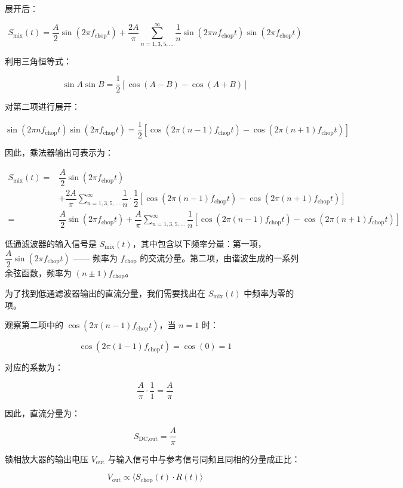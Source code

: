 \documentclass[dvipsnames, svgnames,a4paper,11pt]{article}
\begin{document}
展开后：

\[
S_{\text{mix}}(t) = \dfrac{A}{2} \sin(2\pi f_{\text{chop}} t) + \dfrac{2A}{\pi} \sum_{n=1,3,5,\dots}^{\infty} \dfrac{1}{n} \sin(2\pi n f_{\text{chop}} t) \sin(2\pi f_{\text{chop}} t)
\]

利用三角恒等式：

\[
\sin A \sin B = \dfrac{1}{2} [\cos(A - B) - \cos(A + B)]
\]

对第二项进行展开：

\[
\sin(2\pi n f_{\text{chop}} t) \sin(2\pi f_{\text{chop}} t) = \dfrac{1}{2} \left[ \cos(2\pi (n - 1) f_{\text{chop}} t) - \cos(2\pi (n + 1) f_{\text{chop}} t) \right]
\]

因此，乘法器输出可表示为：

\[
\begin{aligned}
	S_{\text{mix}}(t) = & \dfrac{A}{2} \sin(2\pi f_{\text{chop}} t) \\
	& + \dfrac{2A}{\pi} \sum_{n=1,3,5,\dots}^{\infty} \dfrac{1}{n} \cdot \dfrac{1}{2} \left[ \cos(2\pi (n - 1) f_{\text{chop}} t) - \cos(2\pi (n + 1) f_{\text{chop}} t) \right] \\
	= & \dfrac{A}{2} \sin(2\pi f_{\text{chop}} t) + \dfrac{A}{\pi} \sum_{n=1,3,5,\dots}^{\infty} \dfrac{1}{n} \left[ \cos(2\pi (n - 1) f_{\text{chop}} t) - \cos(2\pi (n + 1) f_{\text{chop}} t) \right]
\end{aligned}
\]

低通滤波器的输入信号是 \( S_{\text{mix}}(t) \)，其中包含以下频率分量：第一项，\( \dfrac{A}{2} \sin(2\pi f_{\text{chop}} t) \) —— 频率为 \( f_{\text{chop}} \) 的交流分量。第二项，由谐波生成的一系列余弦函数，频率为 \( (n \pm 1) f_{\text{chop}} \)。

为了找到低通滤波器输出的直流分量，我们需要找出在 \( S_{\text{mix}}(t) \) 中频率为零的项。

观察第二项中的 \( \cos(2\pi (n - 1) f_{\text{chop}} t) \)，当 \( n = 1 \) 时：

\[
\cos(2\pi (1 - 1) f_{\text{chop}} t) = \cos(0) = 1
\]

对应的系数为：

\[
\dfrac{A}{\pi} \cdot \dfrac{1}{1} = \dfrac{A}{\pi}
\]

因此，直流分量为：

\[
S_{\text{DC,out}} = \dfrac{A}{\pi}
\]

锁相放大器的输出电压 \( V_{\text{out}} \) 与输入信号中与参考信号同频且同相的分量成正比：

\[
V_{\text{out}} \propto \langle S_{\text{chop}}(t) \cdot R(t) \rangle
\]
\end{document}

